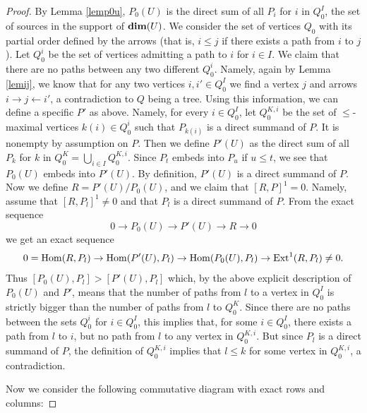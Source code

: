 \documentclass{amsart}
\numberwithin{equation}{section}
\theoremstyle{remark}
\begin{document}
\begin{proof} 
By Lemma \ref{lemp0u}, $P_0(U)$ is the direct sum of all $P_i$ for $i$ in $Q_0^I$, the set of sources in the support of ${\rm\bf dim}(U)$. We consider the set of vertices $Q_0$ with its partial order defined by the arrows (that is, $i\leq j$ if there exists a path from $i$ to $j$). Let $Q_0^i$ be the set of vertices admitting a path to $i$ for $i\in I$. We claim that there are no paths between any two different $Q_0^i$. Namely, again by Lemma \ref{lemij}, we know that for any two vertices $i,i'\in Q_0^I$ we find a vertex $j$ and arrows $i\rightarrow j\leftarrow i'$, a contradiction to $Q$ being a tree. Using this information, we can define a specific $P'$ as above. Namely, for every $i\in Q_0^I$, let $Q_0^{K,i}$ be the set of $\leq$-maximal vertices $k(i)\in Q_0^i$ such that $P_{k(i)}$ is a direct summand of $P$. It is nonempty by assumption on $P$. Then we define $P'(U)$ as the direct sum of all $P_k$ for $k$ in $Q_0^K=\bigcup_{i\in I}Q_0^{K,i}$. Since $P_t$ embeds into $P_u$ if $u\leq t$, we see that $P_0(U)$ embeds into $P'(U)$. By definition, $P'(U)$ is a direct summand of $P$. Now we define $R=P'(U)/P_0(U)$, and we claim that $[R,P]^1=0$. Namely, assume that $[R,P_l]^1\not=0$ and that $P_l$ is a direct summand of $P$. From the exact sequence
$$0\rightarrow P_0(U)\rightarrow P'(U)\rightarrow R\rightarrow 0$$
we get an exact sequence
$$
0={\rm Hom}(R,P_l)\rightarrow{\rm Hom}(P'(U),P_l)\rightarrow{\rm Hom}(P_0(U),P_l)\rightarrow{\rm Ext}^1(R,P_l)\not=0.
$$
Thus $[P_0(U),P_l]>[P'(U),P_l]$ which, by the above explicit description of $P_0(U)$ and $P'$, 
means that the number of paths from $l$ to a vertex in $Q_0^I$ is strictly bigger than the number 
of paths from $l$ to $Q_0^K$. Since there are no paths between the sets $Q_0^i$ for $i\in Q_0^I$, 
this implies that, for some $i\in Q_0^I$, there exists a path from $l$ to $i$, but no path from $l$ 
to any vertex in $Q_0^{K,i}$. But since $P_l$ is a direct summand of $P$, the definition of $Q_0^{K,i}$ implies that $l\leq k$ for some vertex in $Q_0^{K,i}$, a contradiction.

Now we consider the following commutative diagram with exact rows and columns:


\end{proof}
\end{document}
